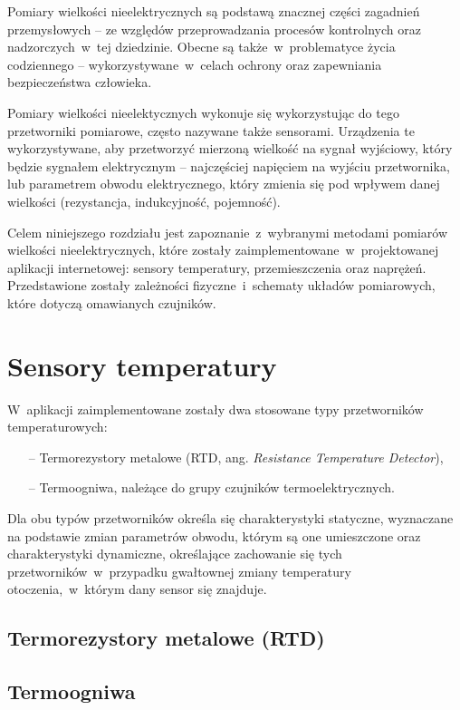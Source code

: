 Pomiary wielkości nieelektrycznych są podstawą znacznej części zagadnień przemysłowych -- ze
względów przeprowadzania procesów kontrolnych oraz nadzorczych~w~tej dziedzinie. Obecne są
także~w~problematyce życia codziennego -- wykorzystywane~w~celach ochrony oraz zapewniania
bezpieczeństwa człowieka.

Pomiary wielkości nieelektycznych wykonuje się wykorzystując do tego przetworniki pomiarowe, często
nazywane także sensorami. Urządzenia te wykorzystywane, aby przetworzyć mierzoną wielkość na sygnał
wyjściowy, który będzie sygnałem elektrycznym -- najczęściej napięciem na wyjściu przetwornika,
lub parametrem obwodu elektrycznego, który zmienia się pod wpływem danej wielkości (rezystancja,
indukcyjność, pojemność).

Celem niniejszego rozdziału jest zapoznanie~z~wybranymi metodami pomiarów wielkości
nieelektrycznych, które zostały zaimplementowane~w~projektowanej aplikacji internetowej: sensory
temperatury, przemieszczenia oraz naprężeń. Przedstawione zostały zależności fizyczne~i~schematy
układów pomiarowych, które dotyczą omawianych czujników.

\section{Sensory temperatury}\label{sect:theory-temperature}
W~aplikacji zaimplementowane zostały dwa stosowane typy przetworników temperaturowych:
\begin{itemize}
  \item [--] Termorezystory metalowe (RTD, ang. \textit{Resistance Temperature Detector}),
  \item [--] Termoogniwa, należące do grupy czujników termoelektrycznych.
\end{itemize}
Dla obu typów przetworników określa się charakterystyki statyczne, wyznaczane na podstawie zmian
parametrów obwodu, którym są one umieszczone oraz charakterystyki dynamiczne, określające zachowanie
się tych przetworników~w~przypadku gwałtownej zmiany temperatury otoczenia,~w~którym dany sensor się
znajduje.

\subsection{Termorezystory metalowe (RTD)}


\subsection{Termoogniwa}


